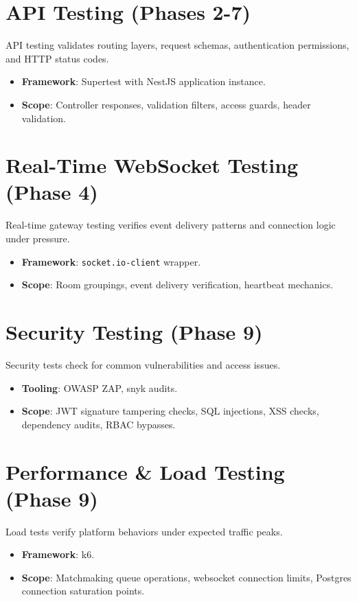 \documentclass[11pt,a4paper]{report}
\begin{document}
\section{API Testing (Phases 2-7)}
API testing validates routing layers, request schemas, authentication permissions, and HTTP status codes.
\begin{itemize}
    \item \textbf{Framework}: Supertest with NestJS application instance.
    \item \textbf{Scope}: Controller responses, validation filters, access guards, header validation.
\end{itemize}

\section{Real-Time WebSocket Testing (Phase 4)}
Real-time gateway testing verifies event delivery patterns and connection logic under pressure.
\begin{itemize}
    \item \textbf{Framework}: \texttt{socket.io-client} wrapper.
    \item \textbf{Scope}: Room groupings, event delivery verification, heartbeat mechanics.
\end{itemize}

\section{Security Testing (Phase 9)}
Security tests check for common vulnerabilities and access issues.
\begin{itemize}
    \item \textbf{Tooling}: OWASP ZAP, snyk audits.
    \item \textbf{Scope}: JWT signature tampering checks, SQL injections, XSS checks, dependency audits, RBAC bypasses.
\end{itemize}

\section{Performance \& Load Testing (Phase 9)}
Load tests verify platform behaviors under expected traffic peaks.
\begin{itemize}
    \item \textbf{Framework}: k6.
    \item \textbf{Scope}: Matchmaking queue operations, websocket connection limits, Postgres connection saturation points.
\end{itemize}
\end{document}

